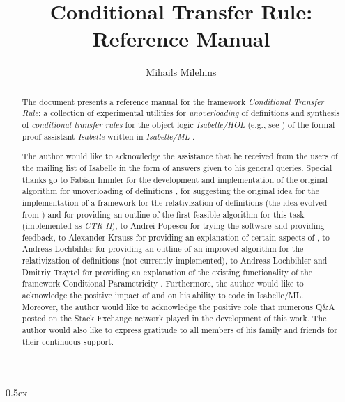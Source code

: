 \documentclass[11pt,a4paper]{article}
\begin{document}
\sloppy

\title{Conditional Transfer Rule: Reference Manual} 
\author{Mihails Milehins}
\maketitle

\newpage

\begin{abstract}
The document presents a reference manual for the framework 
\textit{Conditional Transfer Rule}: a collection of experimental utilities 
for \textit{unoverloading} 
\cite{kaufmann_mechanized_2010} 
of definitions and synthesis 
of \textit{conditional transfer rules} \cite{gonthier_lifting_2013}
for the object logic \textit{Isabelle/HOL} 
(e.g., see \cite{yang_comprehending_2017}) 
of the formal proof assistant \textit{Isabelle} \cite{paulson_natural_1986} 
written in \textit{Isabelle/ML} 
\cite{milner_definition_1997, wenzel_isabelle/isar_2019}. 
\end{abstract}

\newpage

\renewcommand{\abstractname}{Acknowledgements}
\begin{abstract}

The author would like to acknowledge the assistance that he received from 
the users of the mailing list of Isabelle 
\cite{noauthor_isabelle_nodate}
in the form of answers given to his general queries. 
Special thanks go to Fabian Immler for the development and implementation 
of the original algorithm for unoverloading of definitions 
\cite{immler_automation_2019}, for suggesting the original idea for 
the implementation of a framework for the relativization of definitions
(the idea evolved from \cite{immler_smooth_2019}) and for providing 
an outline of the first feasible algorithm for this task (implemented as 
\textit{CTR II}), to Andrei Popescu for trying the software and providing feedback, 
to Alexander Krauss for providing an explanation of certain aspects of 
\cite{kaufmann_mechanized_2010}, 
to Andreas Lochbihler for providing an outline 
of an improved algorithm for the relativization of definitions 
(not currently implemented), to Andreas Lochbihler and Dmitriy Traytel 
for providing an explanation of the existing functionality of the framework 
Conditional Parametricity \cite{gilcher_conditional_2017}.   
Furthermore, the author would like to acknowledge the positive 
impact of \cite{urban_isabelle_2019} and 
\cite{wenzel_isabelle/isar_2019} on his ability to code in Isabelle/ML.
Moreover, the author would like to acknowledge
the positive role that numerous Q\&A posted on the Stack Exchange network 
\cite{noauthor_stack_nodate} played in the development of this work. 
The author would also like to express gratitude to all members of his family 
and friends for their continuous support.

\end{abstract}

\newpage

\tableofcontents

\newpage

\parindent 0pt\parskip 0.5ex



\newpage


\end{document}

